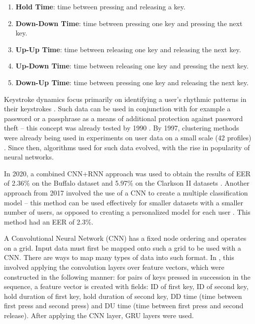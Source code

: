 \begin{enumerate}
    \item \textbf{Hold Time}: time between pressing and releasing a key.
    \item \textbf{Down-Down Time}: time between pressing one key and pressing the next key.
    \item \textbf{Up-Up Time}: time between releasing one key and releasing the next key.
    \item \textbf{Up-Down Time}: time between releasing one key and pressing the next key.
    \item \textbf{Down-Up Time}: time between pressing one key and releasing the next key.
\end{enumerate}

Keystroke dynamics focus primarily on identifying a user's rhythmic patterns in their keystrokes \cite{Lu2020}. Such data can be used in conjunction with for example a password or a passphrase as a means of additional protection against password theft -- this concept was already tested by 1990 \cite{joyce1990keystroke}. By 1997, clustering methods were already being used in experiments on user data on a small scale (42 profiles) \cite{Monr1997}. Since then, algorithms used for such data evolved, with the rise in popularity of neural networks.

In 2020, a combined CNN+RNN approach was used to obtain the results of EER of 2.36\% on the Buffalo dataset and 5.97\% on the Clarkson II datasets \cite{Lu2020}. Another approach from 2017 involved the use of a CNN to create a multiple classification model -- this method can be used effectively for smaller datasets with a smaller number of users, as opposed to creating a personalized model for each user \cite{ceker_cnn2017}\cite{Lu2020}. This method had an EER of 2.3\%. 

A Convolutional Neural Network (CNN) has a fixed node ordering and operates on a grid. Input data must first be mapped onto such a grid to be used with a CNN. There are ways to map many types of data into such format. In \cite{Lu2020}, this involved applying the convolution layers over feature vectors, which were constructed in the following manner: for pairs of keys pressed in succession in the sequence, a feature vector is created with fields: ID of first key, ID of second key, hold duration of first key, hold duration of second key, DD time (time between first press and second press) and DU time (time between first press and second release). After applying the CNN layer, GRU layers were used.

